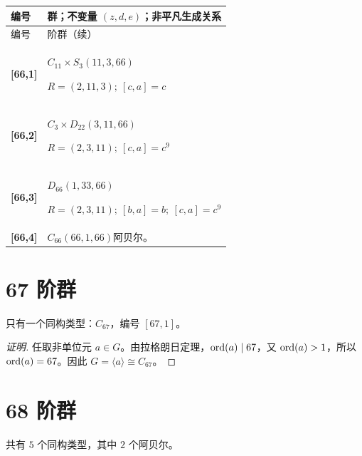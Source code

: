 \documentclass[UTF8,fontset=fandol,11pt,a4paper]{ctexart}
\begin{document}
\begin{longtable}{@{}p{17mm}>{\raggedright\arraybackslash}p{141mm}@{}}

\toprule 编号 & 群；不变量 $(z,d,e)$；非平凡生成关系\\\midrule\endfirsthead

\toprule 编号 & 66 阶群（续）\\\midrule\endhead\bottomrule\endfoot

\textbf{[66,1]} & $C_{11}\times S_{3}$\quad $(11,3,66)$\par\(R=(2,11,3);\allowbreak\ [c,a]=c\)\\[3pt]

\textbf{[66,2]} & $C_{3}\times D_{22}$\quad $(3,11,66)$\par\(R=(2,3,11);\allowbreak\ [c,a]=c^{9}\)\\[3pt]

\textbf{[66,3]} & $D_{66}$\quad $(1,33,66)$\par\(R=(2,3,11);\allowbreak\ [b,a]=b;\allowbreak\ [c,a]=c^{9}\)\\[3pt]

\textbf{[66,4]} & $C_{66}$\quad $(66,1,66)$\quad 阿贝尔。\\[3pt]

\end{longtable}\endgroup

\section*{67 阶群}\label{order:67}

只有一个同构类型：$C_{67}$，编号 $[67,1]$。

\begin{proof}[证明]
任取非单位元 $a\in G$。由拉格朗日定理，$\operatorname{ord}(a)\mid 67$，又 $\operatorname{ord}(a)>1$，所以 $\operatorname{ord}(a)=67$。因此 $G=\langle a\rangle\cong C_{67}$。
\end{proof}

\section*{68 阶群}\label{order:68}

共有 $5$ 个同构类型，其中 $2$ 个阿贝尔。

\begingroup\small\setlength{\tabcolsep}{3pt}\renewcommand{\arraystretch}{1.12}
\end{document}
